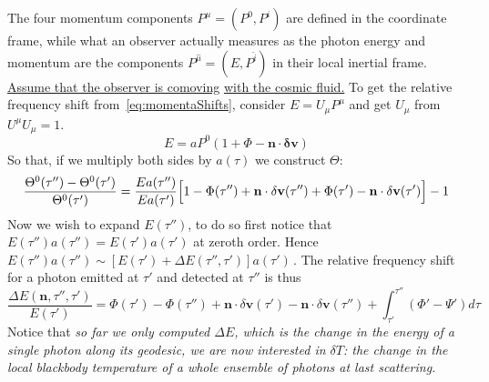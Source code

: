 The four momentum components $P^\mu=(P^0,P^i)$ are defined in the
coordinate frame, while what an observer actually measures as the photon energy
and momentum are the components $P^{\hat{\mu}}=(E,P^{\hat{i}})$ in their local inertial frame. \underline{Assume that the observer is comoving} \underline{with the cosmic fluid.}
To get the relative frequency shift from~\eqref{eq:momentaShifts}, consider $E=U_\mu P^\mu$ and get $U_\mu$ from $U^\mu U_\mu = 1$.
\begin{equation}
    E = aP^{0}\left(1+\Phi-\mathbf{n}\cdot\mathbf{\delta v}\right)
\end{equation}
So that, if we multiply both sides by $a(\tau)$ we construct $\varTheta$:
\begin{equation}
    \frac{\Theta^{0}(\tau'')-\Theta^{0}(\tau')}{\Theta^{0}(\tau')} = \frac{E a(\tau'')}{E a(\tau')}\Bigl[1-\Phi(\tau'')+\mathbf{n}\cdot \delta\mathbf{v}(\tau'')+\Phi(\tau')-\mathbf{n} \cdot \delta\mathbf{v}(\tau')\Bigr] - 1
\end{equation}
Now we wish to expand $E(\tau'')$, to do so first notice that $E(\tau'')a(\tau'')=E(\tau')a(\tau')$ at zeroth order. Hence $E(\tau'')a(\tau'') \sim \left[E(\tau')+ \Delta E(\tau'',\tau')\right]a(\tau')\,$. The relative frequency shift for a photon emitted at $\tau'$ and detected at $\tau''$ is thus
\begin{equation}\label{eq:photonEnergyShift}
    \frac{\Delta E(\mathbf{n},\tau'',\tau')}{E(\tau')} = \Phi(\tau')- \Phi(\tau'') +  \mathbf{n} \cdot \delta\mathbf{v}(\tau') -\mathbf{n}\cdot \delta\mathbf{v}(\tau'') + \int_{\tau'}^{\tau''} \left(\Phi'-\Psi'\right)d\tau 
\end{equation}
Notice that \emph{so far we only computed $\Delta E$, which is the change in the energy of a single photon along its geodesic, we are now interested in $\delta T$: the change in the local blackbody temperature of a whole ensemble of photons at last scattering.} 

